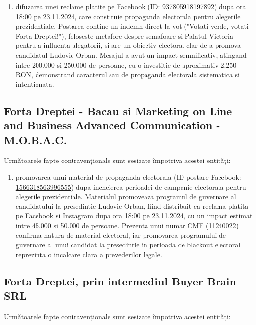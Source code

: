 \documentclass[a4paper,12pt]{article}
\begin{document}
\begin{enumerate}[leftmargin=*, label=\arabic*.)]
    \item difuzarea unei reclame platite pe Facebook (ID: \href{https://www.facebook.com/ads/library/?id=937805918197892}{937805918197892}) dupa ora 18:00 pe 23.11.2024, care constituie propaganda electorala pentru alegerile prezidentiale. Postarea contine un indemn direct la vot ("Votati verde, votati Forta Dreptei!"), foloseste metafore despre semafoare si Palatul Victoria pentru a influenta alegatorii, si are un obiectiv electoral clar de a promova candidatul Ludovic Orban. Mesajul a avut un impact semnificativ, atingand intre 200.000 si 250.000 de persoane, cu o investitie de aproximativ 2.250 RON, demonstrand caracterul sau de propaganda electorala sistematica si intentionata.
\end{enumerate}

\vspace{0.5cm}

\subsection{Forta Dreptei - Bacau si Marketing on Line and Business Advanced Communication - M.O.B.A.C.}
Următoarele fapte contravenționale sunt sesizate împotriva acestei entități:

\begin{enumerate}[leftmargin=*, label=\arabic*.)]
    \item promovarea unui material de propaganda electorala (ID postare Facebook: \href{https://www.facebook.com/ads/library/?id=1566318563996555}{1566318563996555}) dupa incheierea perioadei de campanie electorala pentru alegerile prezidentiale. Materialul promoveaza programul de guvernare al candidatului la presedintie Ludovic Orban, fiind distribuit ca reclama platita pe Facebook si Instagram dupa ora 18:00 pe 23.11.2024, cu un impact estimat intre 45.000 si 50.000 de persoane. Prezenta unui numar CMF (11240022) confirma natura de material electoral, iar promovarea programului de guvernare al unui candidat la presedintie in perioada de blackout electoral reprezinta o incalcare clara a prevederilor legale.
\end{enumerate}

\vspace{0.5cm}

\subsection{Forta Dreptei, prin intermediul Buyer Brain SRL}
Următoarele fapte contravenționale sunt sesizate împotriva acestei entități:
\end{document}
